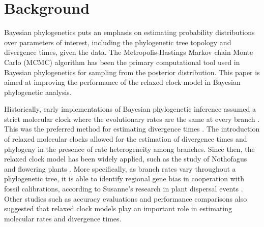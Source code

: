 \documentclass{bmcart}
\begin{document}
\begin{frontmatter}
\begin{abstractbox}

\end{abstractbox}
%
\end{frontmatter}


\section*{Background}
Bayesian phylogenetics puts an emphasis on estimating probability distributions over parameters of interest, including the phylogenetic tree topology and divergence times, given the data. The Metropolis-Hastings Markov chain Monte Carlo (MCMC) \cite{metropolis1953equation,hastings1970monte} algorithm has been the primary computational tool used in Bayesian phylogenetics for sampling from the posterior distribution. This paper is aimed at improving the performance of the relaxed clock model in Bayesian phylogenetic analysis.

Historically, early implementations of Bayesian phylogenetic inference \cite{yang1997bayesian} assumed a strict molecular clock where the evolutionary rates are the same at every branch \cite{zuckerkandl1965evolutionary}. This was the preferred method for estimating divergence times \cite{yang1997bayesian,rannala2003bayes}. The introduction of relaxed molecular clocks allowed for the estimation of divergence times \cite{thorne1998estimating} and phylogeny \cite{drummond2006relaxed} in the presence of rate heterogeneity among branches. Since then, the relaxed clock model has been widely applied, such as the study of Nothofagus \cite{knapp2005relaxed} and flowering plants \cite{smith2010uncorrelated}. More specifically, as branch rates vary throughout a phylogenetic tree, it is able to identify regional gene bias in cooperation with fossil calibrations, according to Susanne's research in plant dispersal events \cite{renner2005relaxed}. Other studies such as accuracy evaluations \cite{ho2005accuracy} and performance comparisons \cite{lepage2007general} also suggested that relaxed clock models play an important role in estimating molecular rates and divergence times.
\end{document}
